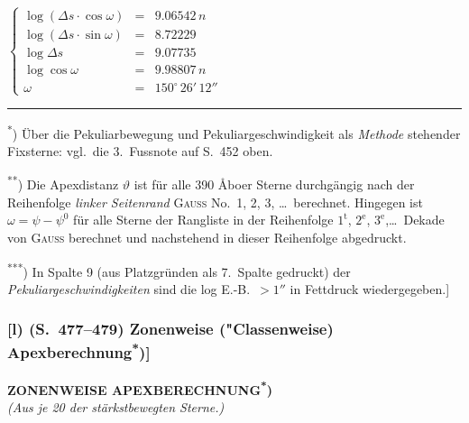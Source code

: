 \documentclass[12pt,a4paper]{article}
\theoremstyle{plain}
\theoremstyle{definition}
\theoremstyle{remark}
\begin{document}
\begin{small}
[76 a] $\left\{\begin{array}{rcl}
\log(\Delta s\cdot\cos\omega) & = & 9.06542\,n \\
\log(\Delta s\cdot\sin\omega) & = & 8.72229 \phantom{\,n} \\
\log\Delta s & = & 9.07735 \phantom{\,n} \\
\log\cos\omega & = & 9.98807\,n \\
\omega & = & 150^{\circ}\,26'\,12'' \end{array}\right.$
\end{small}

\medskip
\noindent\rule{\textwidth}{0.4pt}
\begin{footnotesize}
\textsuperscript{*}) \"Uber die Pekuliarbewegung und Pekuliargeschwindigkeit als \textit{Methode}
stehender Fixsterne: vgl.~die 3.~Fussnote auf S.~452 oben.

\textsuperscript{**}) Die Apexdistanz $\vartheta$ ist f\"ur alle 390 \AA boer Sterne durchg\"angig nach der
Reihenfolge \textit{linker Seitenrand} \textsc{Gau\ss} No.~1, 2, 3, \dots\ berechnet. Hingegen ist
$\omega = \psi - \psi^{0}$ f\"ur alle Sterne der Rangliste in der Reihenfolge $1^{\mathrm{t}}$, $2^{\mathrm{e}}$,
$3^{\mathrm{e}}$,\dots\ Dekade von \textsc{Gau\ss} berechnet und nachstehend in dieser Reihenfolge
abgedruckt.

\textsuperscript{***}) In Spalte 9 (aus Platzgr\"unden als 7.~Spalte gedruckt) der
\textit{Pekuliargeschwindigkeiten} sind die log E.-B.~$> 1''$ in Fettdruck wiedergegeben.]
\end{footnotesize}

\newpage
\subsubsection*{[l) (S.~477--479) Zonenweise ("Classenweise) Apexberechnung\textsuperscript{*})]}

\begin{center}
\textbf{ZONENWEISE APEXBERECHNUNG\textsuperscript{*})}\\
\textit{(Aus je 20 der st\"arkstbewegten Sterne.)}
\end{center}
\end{document}
